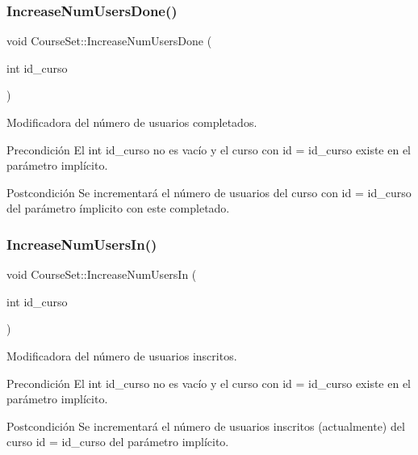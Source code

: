 \subsubsection{\texorpdfstring{Increase\+Num\+Users\+Done()}{IncreaseNumUsersDone()}}
{\footnotesize\ttfamily void Course\+Set\+::\+Increase\+Num\+Users\+Done (\begin{DoxyParamCaption}\item[{int}]{id\+\_\+curso }\end{DoxyParamCaption})}



Modificadora del número de usuarios completados. 

\begin{DoxyPrecond}{Precondición}
El int id\+\_\+curso no es vacío y el curso con id = id\+\_\+curso existe en el parámetro implícito. 
\end{DoxyPrecond}
\begin{DoxyPostcond}{Postcondición}
Se incrementará el número de usuarios del curso con id = id\+\_\+curso del parámetro ímplicito con este completado. 
\end{DoxyPostcond}
\mbox{\label{class_course_set_a6a1532272c28fcb228bae6b9bde47c4e}} 
\subsubsection{\texorpdfstring{Increase\+Num\+Users\+In()}{IncreaseNumUsersIn()}}
{\footnotesize\ttfamily void Course\+Set\+::\+Increase\+Num\+Users\+In (\begin{DoxyParamCaption}\item[{int}]{id\+\_\+curso }\end{DoxyParamCaption})}



Modificadora del número de usuarios inscritos. 

\begin{DoxyPrecond}{Precondición}
El int id\+\_\+curso no es vacío y el curso con id = id\+\_\+curso existe en el parámetro implícito. 
\end{DoxyPrecond}
\begin{DoxyPostcond}{Postcondición}
Se incrementará el número de usuarios inscritos (actualmente) del curso id = id\+\_\+curso del parámetro implícito. 
\end{DoxyPostcond}
\mbox{\label{class_course_set_ab24913a21a3fd64d67346668dbf9159c}} 
